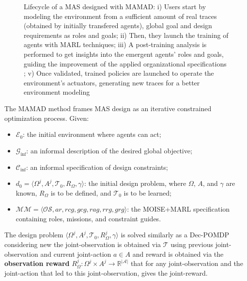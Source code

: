 \documentclass[pdflatex,sn-mathphys-num]{sn-jnl}%
\theoremstyle{thmstyleone}%
\theoremstyle{thmstyletwo}%
\theoremstyle{thmstylethree}%
\begin{document}
\begin{figure}[h!]
    \centering
    
    \caption{Lifecycle of a MAS designed with MAMAD: i) Users start by modeling the environment from a sufficient amount of real traces (obtained by initially transfered agents), global goal and design requirements as roles and goals; \quad ii) Then, they launch the training of agents with MARL techniques; \quad iii) A post-training analysis is performed to get insights into the emergent agents' roles and goals, guiding the improvement of the applied organizational specifications ; \quad v) Once validated, trained policies are launched to operate the environment's actuators, generating new traces for a better environment modeling}
    \label{fig:cycle}
\end{figure}

The MAMAD method frames MAS design as an iterative constrained optimization process. Given:
\begin{itemize}
    \item $\mathcal{E}_0$: the initial environment where agents can act;
    \item $\mathcal{G}_{\text{inf}}$: an informal description of the desired global objective;
    \item $\mathcal{C}_{\text{inf}}$: an informal specification of design constraints;
    \item $d_0 = \langle \Omega^j, A^j, \mathcal{T}_0, R_{\Omega}, \gamma \rangle$: the initial design problem, where $\Omega$, $A$, and $\gamma$ are known, $R_{\Omega}$ is to be defined, and $\mathcal{T}_0$ is to be learned;
    \item $\mathcal{MM} = \langle \mathcal{OS}, ar, rcg, gcg, rag, rrg, grg \rangle$: the MOISE+MARL specification containing roles, missions, and constraint guides.
\end{itemize}

The design problem $\langle \Omega^j, A^j, \mathcal{T}_0, R_{\Omega}^j, \gamma \rangle$ is solved similarly as a Dec-POMDP considering new the joint-observation is obtained via $\mathcal{T}$ using previous joint-observation and current joint-action $a \in A$ and reward is obtained via the \textbf{observation reward} $R^j_{\Omega}: \Omega^j \times A^j \rightarrow \mathbb{R}^{|\mathcal{A}|}$ that for any joint-observation and the joint-action that led to this joint-observation, gives the joint-reward.

\vspace{1em}
\end{document}
